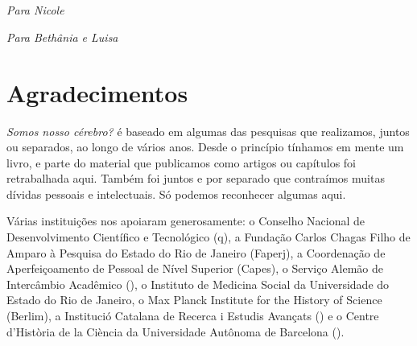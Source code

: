 






\chapter*{}

\vspace*{\fill}

\thispagestyle{empty}
\begin{flushright}
\emph{Para Nicole}\\

\vspace{1cm}

\emph{Para Bethânia e Luisa}\\
\end{flushright}

\chapter{Agradecimentos}

\emph{Somos nosso cérebro?} é baseado em algumas das pesquisas que
realizamos, juntos ou separados, ao longo de vários anos. Desde o
princípio tínhamos em mente um livro, e parte do material que publicamos
como artigos ou capítulos foi retrabalhada aqui. Também foi juntos e por
separado que contraímos muitas dívidas pessoais e intelectuais. Só
podemos reconhecer algumas aqui.

Várias instituições nos apoiaram generosamente: o Conselho Nacional de
Desenvolvimento Científico e Tecnológico (q), a Fundação Carlos
Chagas Filho de Amparo à Pesquisa do Estado do Rio de Janeiro (Faperj),
a Coordenação de Aperfeiçoamento de Pessoal de Nível Superior (Capes), o
Serviço Alemão de Intercâmbio Acadêmico (), o Instituto de Medicina
Social da Universidade do Estado do Rio de Janeiro, o Max Planck
Institute for the History of Science (Berlim), a Institució Catalana de
Recerca i Estudis Avançats () e o Centre d'Història de la Ciència
da Universidade Autônoma de Barcelona ().

